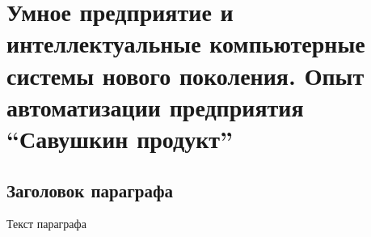 \chapter{Умное предприятие и интеллектуальные компьютерные системы нового поколения. Опыт автоматизации предприятия ``Савушкин продукт''}
\label{chapter_enterprise}


\section{Заголовок параграфа}
Текст параграфа

%